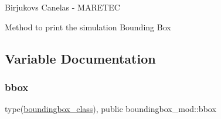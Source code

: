 Birjukovs Canelas -\/ M\+A\+R\+E\+T\+EC 

Method to print the simulation Bounding Box 

\subsection{Variable Documentation}
\mbox{\label{namespaceboundingbox__mod_a45e98e492bb546328c98f618a74622ec}} 
\subsubsection{\texorpdfstring{bbox}{bbox}}
{\footnotesize\ttfamily type(\hyperlink{structboundingbox__mod_1_1boundingbox__class}{boundingbox\+\_\+class}), public boundingbox\+\_\+mod\+::bbox}

